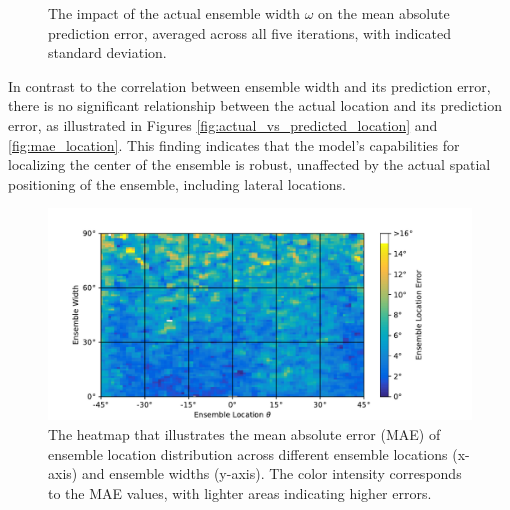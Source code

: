 \documentclass{article}
\begin{document}
\begin{figure}[ht]
\begin{minipage}[t]{0.45\linewidth}
    \caption{\label{fig:mae_width}The impact of the actual ensemble width $\omega$ on the mean absolute prediction error, averaged across all five iterations, with indicated standard deviation.}
  \end{minipage}
\end{figure}

In contrast to the correlation between ensemble width and its prediction error, there is no significant relationship between the actual location and its prediction error, as illustrated in Figures \ref{fig:actual_vs_predicted_location} and \ref{fig:mae_location}. This finding indicates that the model's capabilities for localizing the center of the ensemble is robust, unaffected by the actual spatial positioning of the ensemble, including lateral locations.

\begin{figure}[ht]
  \centering
  \includegraphics[width=\linewidth]{../figures/map_mae_location.pdf}
  \caption{\label{fig:map_mae_location}The heatmap that illustrates the mean absolute error (MAE) of ensemble location distribution across different ensemble locations (x-axis) and ensemble widths (y-axis). The color intensity corresponds to the MAE values, with lighter areas indicating higher errors.}
\end{figure}
\end{document}

